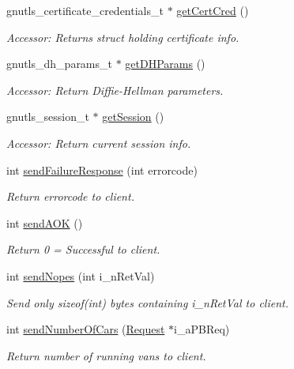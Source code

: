 \begin{DoxyCompactItemize}
gnutls\-\_\-certificate\-\_\-credentials\-\_\-t $\ast$ \hyperlink{classGTBCommunication_aaff60196d8623e94588a9efb1593fa7e}{get\-Cert\-Cred} ()
\begin{DoxyCompactList}\small\item\em Accessor\-: Returns struct holding certificate info. \end{DoxyCompactList}\item 
gnutls\-\_\-dh\-\_\-params\-\_\-t $\ast$ \hyperlink{classGTBCommunication_a73df04ac0442aabd5a1919d6e95501e8}{get\-D\-H\-Params} ()
\begin{DoxyCompactList}\small\item\em Accessor\-: Return Diffie-\/\-Hellman parameters. \end{DoxyCompactList}\item 
gnutls\-\_\-session\-\_\-t $\ast$ \hyperlink{classGTBCommunication_a762b0f4bb1e3f27c01e1ce4b2f3aca65}{get\-Session} ()
\begin{DoxyCompactList}\small\item\em Accessor\-: Return current session info. \end{DoxyCompactList}\item 
int \hyperlink{classGTBCommunication_a48ac2db7bb407da8d59cfbf69110e598}{send\-Failure\-Response} (int errorcode)
\begin{DoxyCompactList}\small\item\em Return errorcode to client. \end{DoxyCompactList}\item 
int \hyperlink{classGTBCommunication_a53163e476fffb9c3b51b7297b5963e6b}{send\-A\-O\-K} ()
\begin{DoxyCompactList}\small\item\em Return 0 = Successful to client. \end{DoxyCompactList}\item 
int \hyperlink{classGTBCommunication_a83fbad40d9605078ff9a8ce29c57b383}{send\-Nopes} (int i\-\_\-n\-Ret\-Val)
\begin{DoxyCompactList}\small\item\em Send only sizeof(int) bytes containing i\-\_\-n\-Ret\-Val to client. \end{DoxyCompactList}\item 
int \hyperlink{classGTBCommunication_a8558ea1c9e19310b986d5ce84398ca20}{send\-Number\-Of\-Cars} (\hyperlink{classRequest}{Request} $\ast$i\-\_\-a\-P\-B\-Req)
\begin{DoxyCompactList}\small\item\em Return number of running vans to client. \end{DoxyCompactList}\item 

\end{DoxyCompactItemize}
